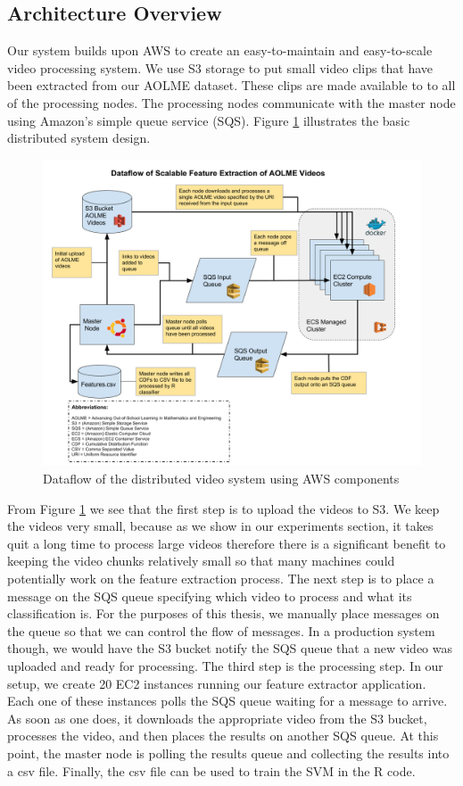 \subsection{\label{subsection:architecture_overview}Architecture Overview}
Our system builds upon AWS to create an easy-to-maintain and easy-to-scale
video processing system. We use S3 storage to put small video clips that
have been extracted from our AOLME dataset. These clips are made available to
to all of the processing nodes. The processing nodes communicate with the master
node using Amazon's simple queue service (SQS). Figure \ref{fig:dataflow} illustrates
the basic distributed system design.

\begin{figure}[h]
  \label{fig:dataflow}
  \centering
  \includegraphics[width=\textwidth]{figures/extract_features_dataflow}
  \caption{Dataflow of the distributed video system using AWS components}
\end{figure}

From Figure \ref{fig:dataflow} we see that the first step is to upload
the videos to S3. We keep the videos very small, because as we show in our experiments
section, it takes quit a long time to process large videos therefore there is a
significant benefit to keeping the video chunks relatively small so that many
machines could potentially work on the feature extraction process. The next step
is to place a message on the SQS queue specifying which video to process and
what its classification is. For the purposes of this thesis, we manually place
messages on the queue so that we can control the flow of messages. In
a production system though, we would have the S3 bucket notify the SQS queue that
a new video was uploaded and ready for processing. The third step is the processing
step. In our setup, we create 20 EC2 instances running our feature extractor application.
Each one of these instances polls the SQS queue waiting for a message to arrive.
As soon as one does, it downloads the appropriate video from the S3 bucket,
processes the video, and then places the results on another SQS queue. At this
point, the master node is polling the results queue and collecting the results
into a csv file. Finally, the csv file can be used to train the SVM in the R
code.

